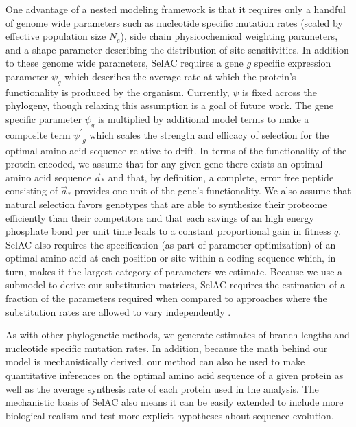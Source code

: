 \documentclass[12pt,letterpaper]{article}
\newcommand{\Ne}{\ensuremath{{N_e}}\xspace} %
\newcommand{\selac}{SelAC\xspace}
\newcommand{\aoptvec}{\ensuremath{\Vec{a}_*}\xspace}
\newcommand{\psiprime}{\ensuremath{\psi^\prime}\xspace}
\begin{document}
One advantage of a nested modeling framework is that it requires only a handful of genome wide parameters such as nucleotide specific mutation rates (scaled by effective population size \Ne), side chain physicochemical weighting parameters, and a shape parameter describing the distribution of site sensitivities. %
In addition to these genome wide parameters, \selac requires a gene $g$ specific expression parameter $\psi_g$ which describes the average rate at which the protein's functionality is produced by the organism.
Currently, $\psi$ is fixed across the phylogeny, though relaxing this assumption is a goal of future work.
The gene specific parameter $\psi_g$ is multiplied by additional model terms to make a composite term $\psiprime_g$ which scales the strength and efficacy of selection for the optimal amino acid sequence relative to drift.
In terms of the functionality of the protein encoded, we assume that for any given gene there exists an optimal amino acid sequence \aoptvec and that, by definition, a complete, error free peptide consisting of \aoptvec provides one unit of the gene's functionality.
We also assume that natural selection favors genotypes that are able to synthesize their proteome efficiently than their competitors and that each savings of an high energy phosphate bond per unit time leads to a constant proportional gain in fitness $q$.
\selac also requires the specification (as part of parameter optimization) of an optimal amino acid at each position or site within a coding sequence which, in turn, makes it the largest category of parameters we estimate.
Because we use a submodel to derive our substitution matrices, \selac requires the estimation of a fraction of the parameters required when compared to approaches where the substitution rates are allowed to vary independently \citep{HalpernAndBruno1998,LartillotAndPhilippe2004,RodrigueAndLartillot2014}.

As with other phylogenetic methods, we generate estimates of branch lengths and nucleotide specific mutation rates.
In addition, because the math behind our model is mechanistically derived, our method can also be used to make quantitative inferences on the optimal amino acid sequence of a given protein as well as the average synthesis rate of each protein used in the analysis.
The mechanistic basis of \selac also means it can be easily extended to include more biological realism and test more explicit hypotheses about sequence evolution.
\end{document}
